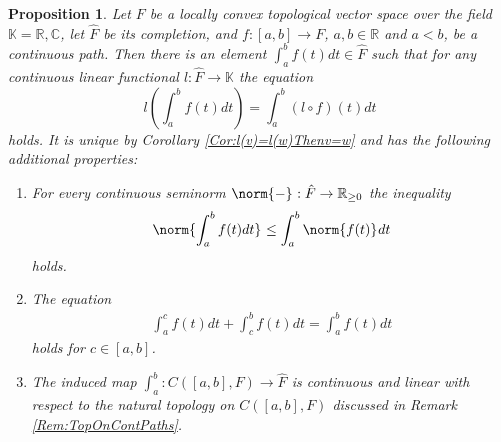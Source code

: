 \documentclass[12pt,a4paper]{article}
\theoremstyle{plain}
\newtheorem{proposition}[theorem]{Proposition}
\theoremstyle{definition}
\newcommand{\R}{\mathbb{R}}
\newcommand{\K}{\mathbb{K}}
\newcommand{\nnorm}[2]{\norm{#1}_{#2}}
\begin{document}
\begin{proposition}
\label{Prop:RiemInt}
Let $F$ be a locally convex topological vector space over the field $\K=\R,\mathbb C$, let $\hat{F}$ be its completion, and $f:[a,b]\to F$, $a,b\in \R$ and $a<b$, be a continuous path. Then there is an element $\int_a^bf(t)dt\in \hat{F}$ such that for any continuous linear functional $l:\hat F\to \K$ the equation $$l\left(\int_a^bf(t)dt\right)=\int_a^b(l\circ f)(t)dt$$ holds. It is unique by Corollary \ref{Cor:l(v)=l(w)Thenv=w} and has the following additional properties:
\begin{enumerate}
    \item \label{Item:IntSeminorm} For every continuous seminorm $\nnorm{-}{}:\hat F\to \R_{\geq0}$ the inequality
    \begin{align*}
        \nnorm{\int_a^bf(t)dt}{}\leq \int_a^b\nnorm{f(t)}{}dt
    \end{align*}
    holds.
    \item \label{Item:intac+intcb=intab} The equation
    \begin{align*}
        \int_a^cf(t)dt+\int_c^bf(t)dt=\int_a^bf(t)dt
    \end{align*}
    holds for $c\in [a,b]$.
    \item \label{Item:IntContLin} The induced map $\int_a^b:C([a,b],F)\to \hat F$ is continuous and linear with respect to the natural topology on $C([a,b],F)$ discussed in Remark \ref{Rem:TopOnContPaths}. 
\end{enumerate}
\end{proposition}
\end{document}

